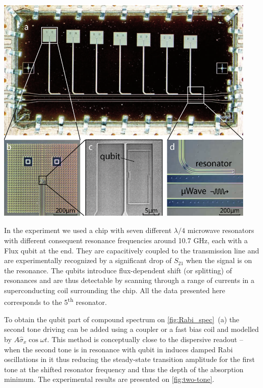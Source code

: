 \documentclass[a0, portrait]{a0poster}
\begin{document}
\begin{multicols}{2}
\begin{tcolorbox}[left=1cm, right=1cm, top=0.5cm, bottom=0.5cm, 
                  title={\Large Sample design}, bottomtitle=.3cm,toptitle=.5cm
                  ]
\hspace{-1cm}
\begin{minipage}{0.4\textwidth}
\centering
\includegraphics[height=11cm]{Pictures/marcus_chip}
\end{minipage}
\begin{minipage}{0.6\textwidth}
In the experiment we used a chip with seven different $\lambda/4$ microwave resonators with different consequent resonance frequencies around 10.7 GHz, each with a Flux qubit at the end. They are capacitively coupled to the transmission line and are experimentally recognized by a significant drop of $S_{21}$ when the signal is on the resonance. The qubits introduce flux-dependent shift (or splitting) of resonances and are thus detectable by scanning through a range of currents in a superconducting coil surrounding the chip. All the data presented here corresponds to the 5\textsuperscript{th} resonator. 
\end{minipage}
\end{tcolorbox}

\begin{tcolorbox}[left=1cm, right=1cm, top=0.5cm, bottom=0.5cm, 
                  title={\Large Two-tone spectroscopy}, bottomtitle=.3cm,toptitle=.5cm
                  ]
To obtain the qubit part of compound spectrum on \autoref{fig:Rabi_spec}~(a) the second tone driving can be added using a coupler or a fast bias coil and modelled by $A \hat \sigma_x \cos\omega t $. This method is conceptually close to the dispersive readout -- when the second tone is in resonance with qubit in induces damped Rabi oscillations in it thus reducing the steady-state transition amplitude for the first tone at the shifted resonator frequency and thus the depth of the absorption minimum. The experimental results are presented on \autoref{fig:two-tone}. \\


\end{tcolorbox}
\end{multicols}
\end{document}
